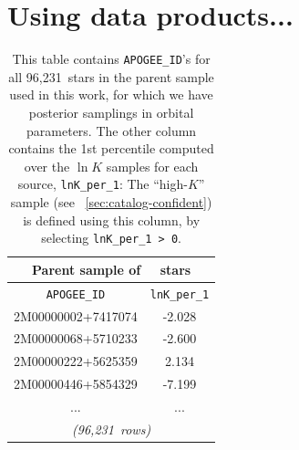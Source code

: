 \documentclass[modern, letterpaper]{aastex62}
\newcommand{\apogee}{\project{\acronym{APOGEE}}}
\newcommand{\DR}{\acronym{DR14}}
\newcommand{\nstars}{96,231}
\begin{document}
\section{Using data products...}
\label{sec:code-demo}


\begin{table}[ht]
    \centering
    \begin{tabular}{c | c}
    \multicolumn{2}{c}{\textbf{Parent sample of \apogee\ \DR\ stars}}\\
    \hline
    \texttt{APOGEE\_ID} & \texttt{lnK\_per\_1} \\
    \hline
    2M00000002+7417074 & -2.028 \\
    2M00000068+5710233 & -2.600 \\
    2M00000222+5625359 &  2.134 \\
    2M00000446+5854329 & -7.199 \\
    ... & ... \\
    \hline
    \multicolumn{2}{c}{\textit{(\nstars\ rows)}}
    \end{tabular}
    \caption{This table contains \texttt{APOGEE\_ID}'s for all \nstars\ stars
    in the parent sample used in this work, for which we have posterior
    samplings in orbital parameters.
    The other column contains the 1st percentile computed over the $\ln K$
    samples for each source, \texttt{lnK\_per\_1}:
    The ``high-$K$'' sample (see \sectionname~\ref{sec:catalog-confident}) is
    defined using this column, by selecting \texttt{lnK\_per\_1 > 0}.
    }
    \label{tbl:lnK-per}
\end{table}


\end{document}
